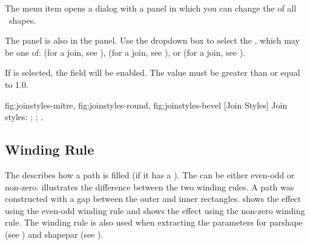 The  menu item opens a dialog
with a  panel in which
you can change the  
of all \selected\ \glspl{shape}.


The  panel is also in the 
 panel. Use the dropdown box to select the
, which may be one of:
(for a  join, see
),
(for a  join, see
), or
(for a  join, see
).


If  is selected, the 
field will be enabled. The value must be greater than or equal to
1.0.

{
   {fig:joinstyles-mitre}{}{},
   {fig:joinstyles-round}{}{},
   {fig:joinstyles-bevel}{}{}
}
[Join Styles]
{Join styles:
 ;
 ;
 .}

\subsection{Winding Rule}\label{sec:winding}

The  describes how a \gls{path} is
filled (if it has a ). The
 can be either
even-odd or non-zero.  illustrates the
difference between the two winding rules. A \gls*{path} was constructed
with a \gls{gap} between the outer and inner rectangles.
 shows the effect using the even-odd
winding rule and  shows the effect
using the non-zero winding rule. The winding rule is also used when
extracting the parameters for
\gls{parshape} (see ) and
\gls{shapepar} (see ).

